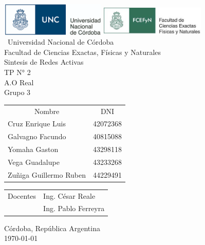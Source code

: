 \begin{titlepage}

\begin{center}
    \includegraphics[width=5cm]{img/unc_logo.png} \hspace{2cm}
    \includegraphics[width=5cm]{img/fcefyn_logo.jpg}
    \\[1cm]
    \vspace{5pt}
    \ \LARGE Universidad Nacional de Córdoba\\[0.5cm] 
    \large Facultad de Ciencias Exactas, Físicas y Naturales \\[0.5cm] 
    \large Sintesis de Redes Activas
    \\[0.2cm]
    \large TP N° 2
    \\[0.2cm]
    \large A.O Real
    \\[0.2cm]
    \large Grupo 3
    \\[0.2cm]
    \vspace{60pt}
    \begin{table}[!h]
    \centering
    \begin{tabular}{ll}
    \multicolumn{1}{c}{Nombre} & \multicolumn{1}{c}{DNI} \\
    Cruz Enrique Luis & 42072368 \\
    Galvagno Facundo& 40815088 \\
    Yomaha Gaston & 43298118 \\
    Vega Guadalupe & 43233268 \\
    Zuñiga Guillermo Ruben & 44229491\\
    
    \end{tabular}
    \end{table}
    \vspace{20pt}
    \begin{table}[!h]
    \centering
    \begin{tabular}{ll}
    \multicolumn{1}{c}{Docentes} & Ing. César Reale \\
     & Ing. Pablo Ferreyra
    \end{tabular}
    \end{table}
    \vfill
    Córdoba, República Argentina\\
    \today
\end{center}

\end{titlepage}